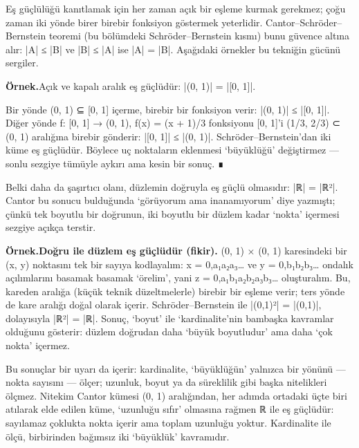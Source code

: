 Eş güçlülüğü kanıtlamak için her zaman açık bir eşleme kurmak gerekmez; çoğu zaman iki yönde birer birebir fonksiyon göstermek yeterlidir. Cantor–Schröder–Bernstein teoremi (bu bölümdeki Schröder--Bernstein kısmı) bunu güvence altına alır: |A| ≤ |B| ve |B| ≤ |A| ise |A| = |B|. Aşağıdaki örnekler bu tekniğin gücünü sergiler.

\begin{tcolorbox}[bookbox,colback=cEx]\textbf{\textsf{\textcolor{cAcc}{Örnek.}}}\quad Açık ve kapalı aralık eş güçlüdür: |(0, 1)| = |[0, 1]|.\par\medskip{}Bir yönde (0, 1) ⊆ [0, 1] içerme, birebir bir fonksiyon verir: |(0, 1)| ≤ |[0, 1]|. Diğer yönde f: [0, 1] → (0, 1), f(x) = (x + 1)/3 fonksiyonu [0, 1]’i (1/3, 2/3) ⊂ (0, 1) aralığına birebir gönderir: |[0, 1]| ≤ |(0, 1)|. Schröder–Bernstein’dan iki küme eş güçlüdür. Böylece uç noktaların eklenmesi ‘büyüklüğü’ değiştirmez — sonlu sezgiye tümüyle aykırı ama kesin bir sonuç. ∎\end{tcolorbox}

Belki daha da şaşırtıcı olanı, düzlemin doğruyla eş güçlü olmasıdır: |ℝ| = |ℝ²|. Cantor bu sonucu bulduğunda ‘görüyorum ama inanamıyorum’ diye yazmıştı; çünkü tek boyutlu bir doğrunun, iki boyutlu bir düzlem kadar ‘nokta’ içermesi sezgiye açıkça terstir.

\begin{tcolorbox}[bookbox,colback=cEx]\textbf{\textsf{\textcolor{cAcc}{Örnek.}}}\quad \textbf{Doğru ile düzlem eş güçlüdür (fikir). }(0, 1) × (0, 1) karesindeki bir (x, y) noktasını tek bir sayıya kodlayalım: x = 0,a₁a₂a₃… ve y = 0,b₁b₂b₃… ondalık açılımlarını basamak basamak ‘örelim’, yani z = 0,a₁b₁a₂b₂a₃b₃… oluşturalım. Bu, kareden aralığa (küçük teknik düzeltmelerle) birebir bir eşleme verir; ters yönde de kare aralığı doğal olarak içerir. Schröder–Bernstein ile |(0,1)²| = |(0,1)|, dolayısıyla |ℝ²| = |ℝ|. Sonuç, ‘boyut’ ile ‘kardinalite’nin bambaşka kavramlar olduğunu gösterir: düzlem doğrudan daha ‘büyük boyutludur’ ama daha ‘çok nokta’ içermez.\end{tcolorbox}

Bu sonuçlar bir uyarı da içerir: kardinalite, ‘büyüklüğün’ yalnızca bir yönünü — nokta sayısını — ölçer; uzunluk, boyut ya da süreklilik gibi başka nitelikleri ölçmez. Nitekim Cantor kümesi (0, 1) aralığından, her adımda ortadaki üçte biri atılarak elde edilen küme, ‘uzunluğu sıfır’ olmasına rağmen ℝ ile eş güçlüdür: sayılamaz çoklukta nokta içerir ama toplam uzunluğu yoktur. Kardinalite ile ölçü, birbirinden bağımsız iki ‘büyüklük’ kavramıdır.

